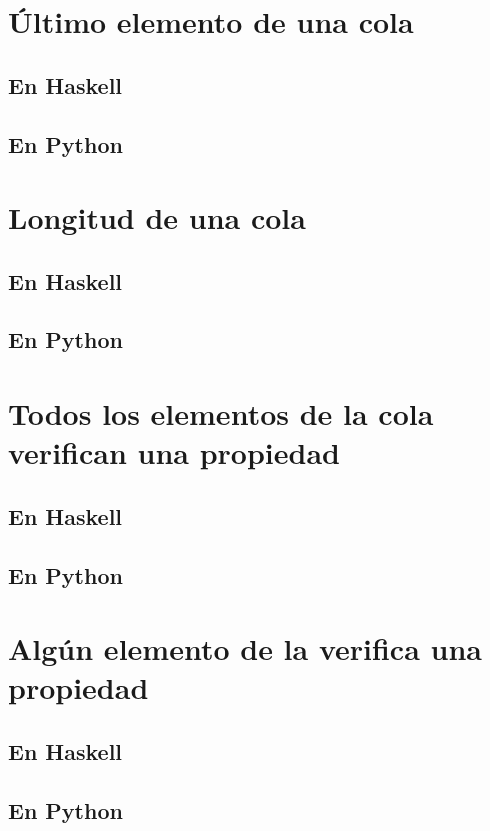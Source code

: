 \documentclass[a4paper,12pt,twoside]{book}
\begin{document}
\section{Último elemento de una cola}
\subsection{En Haskell}
\subsection{En Python}

\section{Longitud de una cola}
\subsection{En Haskell}
\subsection{En Python}

\section{Todos los elementos de la cola verifican una propiedad}
\subsection{En Haskell}
\subsection{En Python}

\section{Algún elemento de la verifica una propiedad}
\subsection{En Haskell}
\subsection{En Python}
\end{document}
